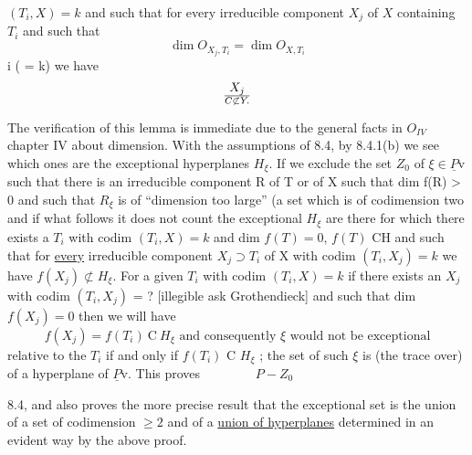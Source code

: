 
$(T_i, X) = k$ and such that for every irreducible component $X_j$ of $X$
containing $T_i$ and such that
\[ \dim O_{X_j, T_i} = \dim O_{X, T_i} \]
i ( = k) we have
\[ X_j \over{C}{\not\subset} Y. \]

The verification of this lemma is immediate due to the general
facts in $O_{IV}$ chapter IV about dimension.  With the assumptions of
8.4, by 8.4.1(b) we see which ones are the exceptional hyperplanes
$H_\xi$.  If we exclude the set $Z_0$ of $\xi \in \underline{P}\mathrm{v}$ such that there is an
irreducible component R of T or of X such that dim f(R) > 0 and
such that $R_\xi$ is of ``dimension too large'' (a set which is of
codimension two and if what follows it does not count the
exceptional $H_\xi$ are there for which there exists a $T_i$ with codim
$(T_i, X) = k$ and dim $f(T) = 0$, $f(T)$ CH and such that for \uline{every}
irreducible component $X_j \supset T_i$ of X with codim $(T_i, X_j) = k$ we have
$f(X_j) \not\subset H_\xi$.  For a given $T_i$ with codim $(T_i, X) = k$ if there exists
an $X_j$ with codim $(T_i, X_j)$ = ? [illegible ask Grothendieck]
and such that dim $f(X_j) = 0$ then we will have
\[ f(X_j) = f(T_i)\ \mathrm{C}\ H_\xi \text{ and consequently } \xi \text{ would not be exceptional} \]
relative to the $T_i$ if and only if $f(T_i)$ C $H_\xi$ ; the set of such $\xi$ is
(the trace over) of a hyperplane of $\underline{P}\mathrm{v}$.  This proves
$\qquad\qquad P - Z_0$

8.4, and also proves the more precise result that the exceptional
set is the union of a set of codimension $\geq 2$ and of a \uline{union of
hyperplanes} determined in an evident way by the above proof.
